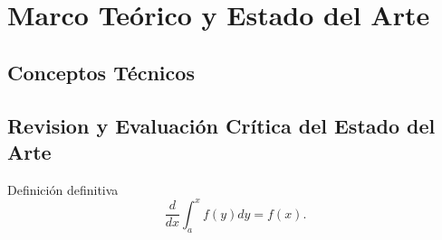 \chapter{Marco Teórico y Estado del Arte}
\section{Conceptos Técnicos}

\section{Revision y Evaluación Crítica del Estado del Arte}


\begin{defn} Definición definitiva $$\frac{d}{dx}\int_a^xf(y)dy=f(x).$$\end{defn}